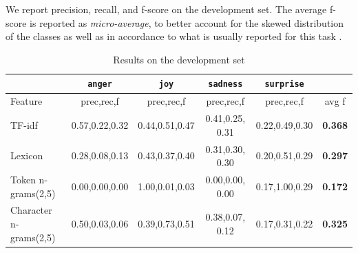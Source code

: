 \documentclass[11pt]{article}
\begin{document}
We report precision, recall, and f-score on the development set. The average f-score is reported as \textit{micro-average}, to better account for the skewed distribution of the classes as well as in accordance to what is usually reported for this task \cite{mohammad2015using}.

\begin{table}[!htbp]
\caption{Results on the development set\label{test_results_svm}}
\centering
\begin{tabular}{|l|c|c|c|c|c|}
\hline
    & \texttt{anger} & \texttt{joy} & \texttt{sadness} & \texttt{surprise} &  \\ 
    \hline
          Feature         & prec,rec,f & prec,rec,f & prec,rec,f & prec,rec,f & avg f \\

\hline
  \footnotesize{TF-idf} &
  \footnotesize{0.57,0.22,0.32}  & 
  \footnotesize{0.44,0.51,0.47} & 
  \footnotesize{0.41,0.25, 0.31} & 
  \footnotesize{0.22,0.49,0.30} & 
  \footnotesize{\textbf{0.368}}  \\ 


\hline
  \footnotesize{Lexicon} &
  \footnotesize{0.28,0.08,0.13}  & 
  \footnotesize{0.43,0.37,0.40} & 
  \footnotesize{0.31,0.30, 0.30} & 
  \footnotesize{0.20,0.51,0.29} & 
   \footnotesize{\textbf{0.297}}  \\ 


\hline
  \footnotesize{Token n-grams(2,5)} &
  \footnotesize{0.00,0.00,0.00}  & 
  \footnotesize{1.00,0.01,0.03} & 
  \footnotesize{0.00,0.00, 0.00} & 
  \footnotesize{0.17,1.00,0.29} & 
  \footnotesize{\textbf{0.172}}  \\ 


\hline
  \footnotesize{Character n-grams(2,5)} &
  \footnotesize{0.50,0.03,0.06}  & 
  \footnotesize{0.39,0.73,0.51} & 
  \footnotesize{0.38,0.07, 0.12} & 
  \footnotesize{0.17,0.31,0.22} & 
  \footnotesize{\textbf{0.325}}  \\ 



\end{tabular}
\end{table}
\end{document}

